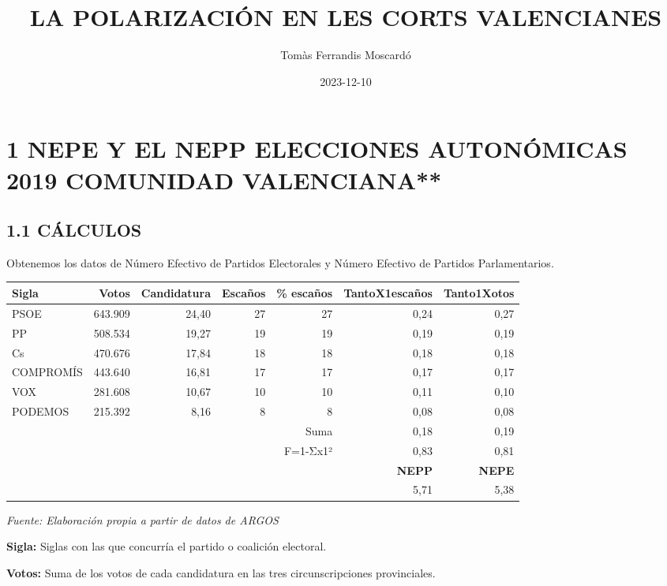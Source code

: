 \documentclass[
]{article}
\title{LA POLARIZACIÓN EN LES CORTS VALENCIANES}
\author{Tomàs Ferrandis Moscardó}
\date{2023-12-10}
\begin{document}
\maketitle

{
\setcounter{tocdepth}{2}
\tableofcontents
}
\hypertarget{nepe-y-el-nepp-elecciones-autonuxf3micas-2019-comunidad-valenciana}{%
\section{1 NEPE Y EL NEPP ELECCIONES AUTONÓMICAS 2019 COMUNIDAD
VALENCIANA**}\label{nepe-y-el-nepp-elecciones-autonuxf3micas-2019-comunidad-valenciana}}

\hypertarget{cuxe1lculos}{%
\subsection{1.1 CÁLCULOS}\label{cuxe1lculos}}

Obtenemos los datos de Número Efectivo de Partidos Electorales y Número
Efectivo de Partidos Parlamentarios.

\begin{longtable}[]{@{}lrrrrrr@{}}
\toprule\noalign{}
Sigla & Votos & Candidatura & Escaños & \% escaños & TantoX1escaños &
Tanto1Xotos \\
\midrule\noalign{}
\endhead
\bottomrule\noalign{}
\endlastfoot
PSOE & 643.909 & 24,40 & 27 & 27 & 0,24 & 0,27 \\
PP & 508.534 & 19,27 & 19 & 19 & 0,19 & 0,19 \\
Cs & 470.676 & 17,84 & 18 & 18 & 0,18 & 0,18 \\
COMPROMÍS & 443.640 & 16,81 & 17 & 17 & 0,17 & 0,17 \\
VOX & 281.608 & 10,67 & 10 & 10 & 0,11 & 0,10 \\
PODEMOS & 215.392 & 8,16 & 8 & 8 & 0,08 & 0,08 \\
& & & & Suma & 0,18 & 0,19 \\
& & & & F=1-Σx1² & 0,83 & 0,81 \\
& & & & & \textbf{NEPP} & \textbf{NEPE} \\
& & & & & 5,71 & 5,38 \\
\end{longtable}

\emph{Fuente: Elaboración propia a partir de datos de ARGOS}

\textbf{Sigla:} Siglas con las que concurría el partido o coalición
electoral.

\textbf{Votos:} Suma de los votos de cada candidatura en las tres
circunscripciones provinciales.
\end{document}
